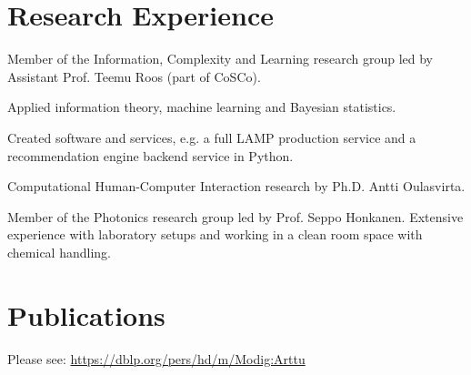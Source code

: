 \documentclass[]{deedy-resume-openfont}
\begin{document}
\begin{minipage}[t]{0.66\textwidth}
\section{Research Experience}
\begin{tightemize}
\item Member of the Information, Complexity and Learning research group led by Assistant Prof. Teemu Roos (part of CoSCo).
\item Applied information theory, machine learning and Bayesian statistics.
\item Created software and services, e.g. a full LAMP production service and a recommendation engine backend service in Python.
\end{tightemize}

\begin{tightemize}
\item Computational Human-Computer Interaction research by Ph.D. Antti Oulasvirta.
\end{tightemize}

\begin{tightemize}
\item Member of the Photonics research group led by Prof. Seppo Honkanen. Extensive experience with laboratory setups and working in a clean room space with chemical handling.
\end{tightemize}


\section{Publications} 
\renewcommand\refname{\vskip -0.8cm} %
%
%
Please see: \href{https://dblp.org/pers/hd/m/Modig:Arttu}{https://dblp.org/pers/hd/m/Modig:Arttu}

\end{minipage} 
\end{document}

